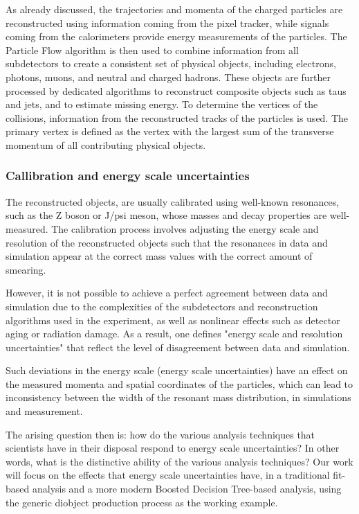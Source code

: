 As already discussed, the trajectories and momenta of the charged particles are reconstructed using information coming from the pixel tracker, while signals coming from the calorimeters provide energy measurements of the particles. The Particle Flow algorithm is then used to combine information from all subdetectors to create a consistent set of physical objects, including electrons, photons, muons, and neutral and charged hadrons. These objects are further processed by dedicated algorithms to reconstruct composite objects such as taus and jets, and to estimate missing energy. To determine the vertices of the collisions, information from the reconstructed tracks of the particles is used. The primary vertex is defined as the vertex with the largest sum of the transverse momentum of all contributing physical objects.
\subsubsection{Callibration and energy scale uncertainties}
\label{sec:org41e8e4d}
The reconstructed objects, are usually calibrated using well-known resonances, such as the Z boson or J/psi meson, whose masses and decay properties are well-measured. The calibration process involves adjusting the energy scale and resolution of the reconstructed objects such that the resonances in data and simulation appear at the correct mass values with the correct amount of smearing.

However, it is not possible to achieve a perfect agreement between data and simulation due to the complexities of the subdetectors and reconstruction algorithms used in the experiment, as well as nonlinear effects such as detector aging or radiation damage. As a result, one defines "energy scale and resolution uncertainties" that reflect the level of disagreement between data and simulation.

Such deviations in the energy scale (energy scale uncertainties) have an effect on the measured momenta and spatial coordinates of the particles, which can lead to inconsistency between the width of the resonant mass distribution, in simulations and measurement.

The arising question then is: how do the various analysis techniques that scientists have in their disposal respond to energy scale uncertainties? In other words, what is the distinctive ability of the various analysis techniques? Our work will focus on the effects that energy scale uncertainties have, in a traditional fit-based analysis and a more modern Boosted Decision Tree-based analysis, using the generic diobject production process as the working example.
